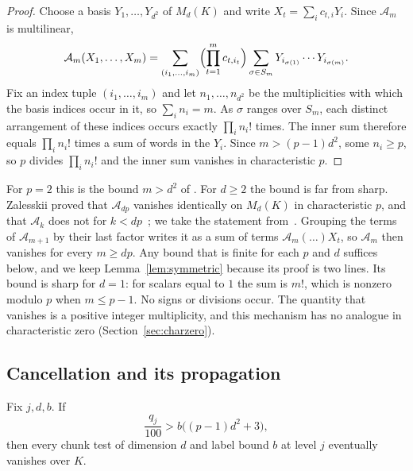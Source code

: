\begin{proof}
Choose a basis $Y_1,\dots,Y_{d^2}$ of $M_d(K)$ and write $X_t=\sum_ic_{t,i}Y_i$. Since $\mathcal A_m$ is multilinear,
\[
 \mathcal A_m(X_1,\dots,X_m)=\sum_{(i_1,\dots,i_m)}\Bigl(\prod_{t=1}^mc_{t,i_t}\Bigr)
 \sum_{\sigma\in S_m}Y_{i_{\sigma(1)}}\cdots Y_{i_{\sigma(m)}} .
\]
Fix an index tuple $(i_1,\dots,i_m)$ and let $n_1,\dots,n_{d^2}$ be the multiplicities with which the basis indices
occur in it, so $\sum_in_i=m$. As $\sigma$ ranges over $S_m$, each distinct arrangement of these indices occurs exactly
$\prod_in_i!$ times. The inner sum therefore equals $\prod_in_i!$ times a sum of words in the $Y_i$. Since $m>(p-1)d^2$,
some $n_i\geq p$, so $p$ divides $\prod_in_i!$ and the inner sum vanishes in characteristic $p$.
\end{proof}

For $p=2$ this is the bound $m>d^2$ of \cite[Lemma~3.2]{OAI247periodic}. For $d\geq2$ the bound is far from sharp.
Zalesskii proved that $\mathcal A_{dp}$ vanishes identically on $M_d(K)$ in characteristic $p$, and that $\mathcal A_k$
does not for $k<dp$~\cite{Zalesskii1985}; we take the statement from~\cite{Valenti1998}. Grouping the terms of
$\mathcal A_{m+1}$ by their last factor writes it as a sum of terms $\mathcal A_m(\dots)X_t$, so $\mathcal A_m$ then
vanishes for every $m\geq dp$. Any bound that is finite for each $p$ and $d$ suffices below, and we keep
Lemma~\ref{lem:symmetric} because its proof is two lines. Its bound is sharp for $d=1$: for scalars equal
to $1$ the sum is $m!$, which is nonzero modulo $p$ when $m\leq p-1$. No signs or divisions occur. The quantity that
vanishes is a positive integer multiplicity, and this mechanism has no analogue in characteristic zero
(Section~\ref{sec:charzero}).

\subsection{Cancellation and its propagation}

\begin{lemma}\label{lem:direct}
Fix $j,d,b$. If
\begin{equation}\label{eq:direct-bound}
 \frac{q_j}{100}>b\bigl((p-1)d^2+3\bigr),
\end{equation}
then every chunk test of dimension $d$ and label bound $b$ at level $j$ eventually vanishes over $K$.
\end{lemma}

